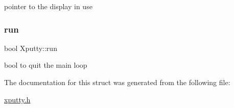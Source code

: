 pointer to the display in use \mbox{\label{structXputty_a3a8e0381e77ae9fae69aab5dda8e7e7a}} 
\subsubsection{\texorpdfstring{run}{run}}
{\footnotesize\ttfamily bool Xputty\+::run}

bool to quit the main loop 

The documentation for this struct was generated from the following file\+:\begin{DoxyCompactItemize}
\item 
\hyperlink{xputty_8h}{xputty.\+h}\end{DoxyCompactItemize}
